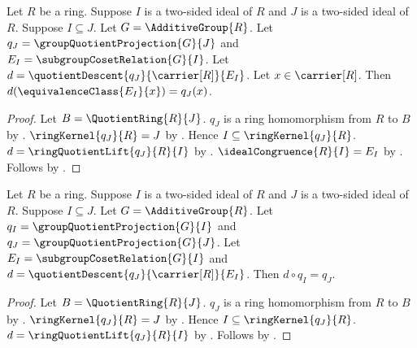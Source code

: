 \begin{proposition}\label{ring_quotient_comparison_apply}
    Let $R$ be a ring.
    Suppose $I$ is a two-sided ideal of $R$ and
        $J$ is a two-sided ideal of $R$.
    Suppose $I\subseteq J$.
    Let $G=\AdditiveGroup{R}$.
    Let $q_J=\groupQuotientProjection{G}{J}$ and
        $E_I=\subgroupCosetRelation{G}{I}$.
    Let $d=\quotientDescent{q_J}{\carrier[R]}{E_I}$.
    Let $x\in\carrier[R]$.
    Then $d(\equivalenceClass{E_I}{x})=q_J(x)$.
\end{proposition}
\begin{proof}
    Let $B=\QuotientRing{R}{J}$.
    $q_J$ is a ring homomorphism from $R$ to $B$ by
        .
    $\ringKernel{q_J}{R}=J$ by
        .
    Hence $I\subseteq\ringKernel{q_J}{R}$.
    $d=\ringQuotientLift{q_J}{R}{I}$ by
        .
    $\idealCongruence{R}{I}=E_I$ by
        .
    Follows by .
\end{proof}

\begin{theorem}\label{ring_quotient_comparison_factorization}
    Let $R$ be a ring.
    Suppose $I$ is a two-sided ideal of $R$ and
        $J$ is a two-sided ideal of $R$.
    Suppose $I\subseteq J$.
    Let $G=\AdditiveGroup{R}$.
    Let $q_I=\groupQuotientProjection{G}{I}$ and
        $q_J=\groupQuotientProjection{G}{J}$.
    Let $E_I=\subgroupCosetRelation{G}{I}$ and
        $d=\quotientDescent{q_J}{\carrier[R]}{E_I}$.
    Then $d\circ q_I=q_J$.
\end{theorem}
\begin{proof}
    Let $B=\QuotientRing{R}{J}$.
    $q_J$ is a ring homomorphism from $R$ to $B$ by
        .
    $\ringKernel{q_J}{R}=J$ by
        .
    Hence $I\subseteq\ringKernel{q_J}{R}$.
    $d=\ringQuotientLift{q_J}{R}{I}$ by
        .
    Follows by .
\end{proof}

